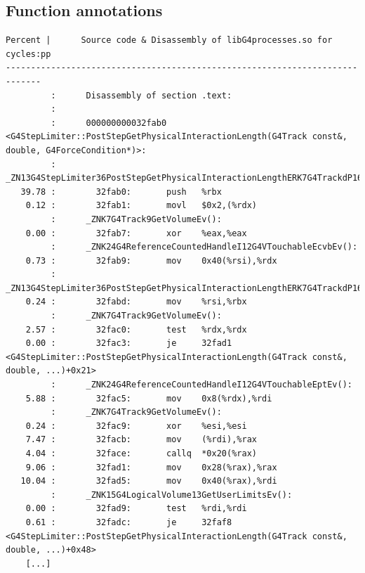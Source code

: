 \documentclass[a4paper]{jpconf}
\begin{document}
\newpage
\newpage
\begin{appendices}

\section{Function annotations}

\begin{minipage}{\linewidth}
\begin{lstlisting}[language={[x64]Assembler}, basicstyle=\ttfamily\tiny, 
caption=G4StepLimiter::PostStepGetPhysicalInteractionLength cycles annotation]
Percent |      Source code & Disassembly of libG4processes.so for  cycles:pp
-----------------------------------------------------------------------------
         :      Disassembly of section .text:
         :
         :      000000000032fab0 <G4StepLimiter::PostStepGetPhysicalInteractionLength(G4Track const&, double, G4ForceCondition*)>:
         :      _ZN13G4StepLimiter36PostStepGetPhysicalInteractionLengthERK7G4TrackdP16G4ForceCondition():
   39.78 :        32fab0:       push   %rbx
    0.12 :        32fab1:       movl   $0x2,(%rdx)
         :      _ZNK7G4Track9GetVolumeEv():
    0.00 :        32fab7:       xor    %eax,%eax
         :      _ZNK24G4ReferenceCountedHandleI12G4VTouchableEcvbEv():
    0.73 :        32fab9:       mov    0x40(%rsi),%rdx
         :      _ZN13G4StepLimiter36PostStepGetPhysicalInteractionLengthERK7G4TrackdP16G4ForceCondition():
    0.24 :        32fabd:       mov    %rsi,%rbx
         :      _ZNK7G4Track9GetVolumeEv():
    2.57 :        32fac0:       test   %rdx,%rdx
    0.00 :        32fac3:       je     32fad1 <G4StepLimiter::PostStepGetPhysicalInteractionLength(G4Track const&, double, ...)+0x21>
         :      _ZNK24G4ReferenceCountedHandleI12G4VTouchableEptEv():
    5.88 :        32fac5:       mov    0x8(%rdx),%rdi
         :      _ZNK7G4Track9GetVolumeEv():
    0.24 :        32fac9:       xor    %esi,%esi
    7.47 :        32facb:       mov    (%rdi),%rax
    4.04 :        32face:       callq  *0x20(%rax)
    9.06 :        32fad1:       mov    0x28(%rax),%rax
   10.04 :        32fad5:       mov    0x40(%rax),%rdi
         :      _ZNK15G4LogicalVolume13GetUserLimitsEv():
    0.00 :        32fad9:       test   %rdi,%rdi
    0.61 :        32fadc:       je     32faf8 <G4StepLimiter::PostStepGetPhysicalInteractionLength(G4Track const&, double, ...)+0x48>
    [...]
\end{lstlisting}
\end{minipage}


\end{appendices}
\end{document}
